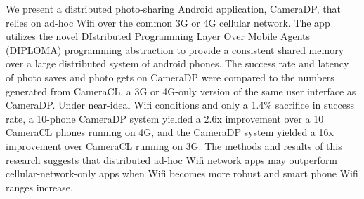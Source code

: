 We present a distributed photo-sharing Android application, CameraDP, that relies on ad-hoc Wifi over the common 3G or 4G cellular network. The app utilizes the novel DIstributed Programming Layer Over Mobile Agents (DIPLOMA) programming abstraction to provide a consistent shared memory over a large distributed system of android phones. The success rate and latency of photo saves and photo gets on CameraDP were compared to the numbers generated from CameraCL, a 3G or 4G-only version of the same user interface as CameraDP. Under near-ideal Wifi conditions and only a 1.4\% sacrifice in success rate, a 10-phone CameraDP system yielded a 2.6x improvement over a 10 CameraCL phones running on 4G, and the CameraDP system yielded a 16x improvement over CameraCL running on 3G. The methods and results of this research suggests that distributed ad-hoc Wifi network apps may outperform cellular-network-only apps when Wifi becomes more robust and smart phone Wifi ranges increase.

